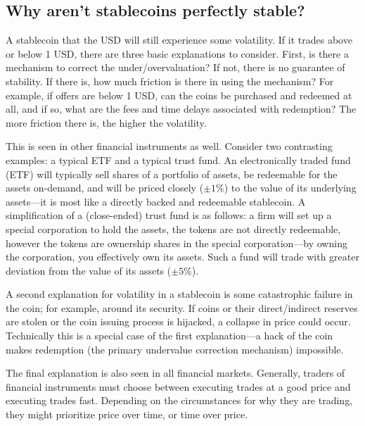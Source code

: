 
\subsection{Why aren't stablecoins perfectly stable?}\label{sec:stability}

A stablecoin that the USD will still experience some volatility. If it trades above or below 1 USD, there are three basic explanations to consider. First, is there a mechanism to correct the under/overvaluation? If not, there is no guarantee of stability. If there is, how much friction is there in using the mechanism? For example, if offers are below 1 USD, can the coins be purchased and redeemed at all, and if so, what are the fees and time delays associated with redemption? The more friction there is, the higher the volatility. 

This is seen in other financial instruments as well. Consider two contrasting examples: a typical ETF and a typical trust fund. An electronically traded fund (ETF) will typically sell shares of a portfolio of assets, be redeemable for the assets on-demand, and will be priced closely ($\pm 1\%$) to the value of its underlying assets---it is most like a directly backed and redeemable stablecoin. A simplification of a (close-ended) trust fund is as follows: a firm will set up a special corporation to hold the assets, the tokens are not directly redeemable, however the tokens are ownership shares in the special corporation---by owning the corporation, you effectively own its assets. Such a fund will trade with greater deviation from the value of its assets ($\pm 5\%$).

A second explanation for volatility in a stablecoin is some catastrophic failure in the coin; for example, around its security. If coins or their direct/indirect reserves are stolen or the coin issuing process is hijacked, a collapse in price could occur. Technically this is a special case of the first explanation---a hack of the coin makes redemption (the primary undervalue correction mechanism) impossible.

The final explanation is also seen in all financial markets. Generally, traders of financial instruments must choose between executing trades at a good price and executing trades fast. Depending on the circumstances for why they are trading, they might prioritize price over time, or time over price.

